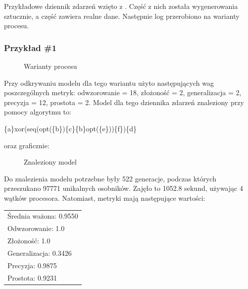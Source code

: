 Przykładowe dziennik zdarzeń wzięto z \cite{}. Część z nich została wygenerowania sztucznie, a część zawiera realne dane. Następnie log przerobiono na warianty procesu. 

\subsubsection{Przykład \#1}
\begin{figure}[!ht]
	\caption{\label{fig:flow_chart}Warianty procesu}
\end{figure}

Przy odkrywaniu modelu dla tego wariantu użyto następujących wag poszczególnych metryk: odwzorowanie = 18, złożoność = 2, generalizacja = 2, precyzja = 12, prostota = 2. Model dla tego dziennika zdarzeń znaleziony przy pomocy algorytmu to:
\begin{center}
	\{a\}xor(seq(opt(\{b\})\{c\}\{b\}opt(\{e\}))\{f\})\{d\}
\end{center}
oraz graficznie:

\begin{figure}[!ht]
	\caption{\label{fig:flow_chart}Znaleziony model}
\end{figure}

Do znalezienia modelu potrzebne były 522 generacje, podczas których przeszukano 97771 unikalnych osobników. Zajęło to 1052.8 sekund, używając 4 wątków procesora. Natomiast, metryki mają następujące wartości: 

 \begin{center}
  \begin{tabular}{l}
	Średnia ważona: 0.9550 \\
	Odwzorowanie: 1.0 \\
	Złożoność: 1.0 \\
	Generalizacja: 0.3426 \\
	Precyzja: 0.9875 \\
	Prostota: 0.9231
  \end{tabular}
 \end{center}
 
